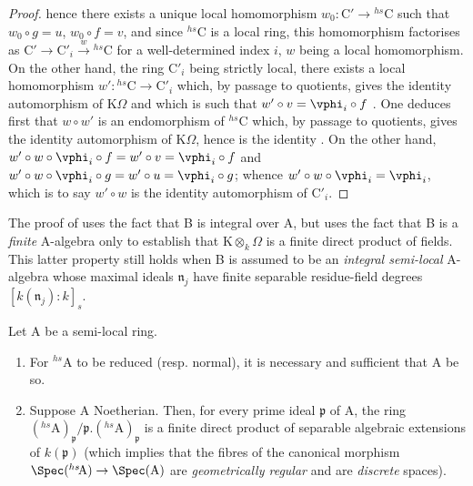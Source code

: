 \begin{proof}
hence there exists a unique local homomorphism $w_0:\mathrm{C}'\to{}^{hs}\!\mathrm{C}$ such that $w_0\circ g=u$, $w_0\circ f=v$, and since ${}^{hs}\!\mathrm{C}$ is a local ring, this homomorphism factorises as $\mathrm{C}'\to\mathrm{C}'_i\xrightarrow{w}{}^{hs}\!\mathrm{C}$ for a well-determined index $i$, $w$ being a local homomorphism.
On the other hand, the ring $\mathrm{C}'_i$ being strictly local, there exists a local homomorphism $w':{}^{hs}\!\mathrm{C}\to\mathrm{C}'_i$ which, by passage to quotients, gives the identity automorphism of $\mathrm{K}\Omega$ and which is such that $w'\circ v=\vphi_i\circ f$ .
One deduces first that $w\circ w'$ is an endomorphism of ${}^{hs}\!\mathrm{C}$ which, by passage to quotients, gives the identity automorphism of $\mathrm{K}\Omega$, hence
is the identity .
On the other hand, $w'\circ w\circ\vphi_i\circ f=w'\circ v=\vphi_i\circ f$ and $w'\circ w\circ\vphi_i\circ g=w'\circ u=\vphi_i\circ g$;
whence $w'\circ w\circ\vphi_i=\vphi_i$, which is to say $w'\circ w$ is the identity automorphism of $\mathrm{C}'_i$.
\end{proof}

\begin{remark}[18.8.11]
\label{IV.18.8.11}
The proof of  uses the fact that B is integral over A, but uses the fact that B is a \emph{finite} A-algebra only to establish that $\mathrm{K}\otimes_k\Omega$ is a finite direct product of fields.
This latter property still holds when B is assumed to be an \emph{integral semi-local} A-algebra whose maximal ideals $\mathfrak{n}_j$ have finite separable residue-field degrees $[k(\mathfrak{n}_j):k]_s$.
\end{remark}

\begin{proposition}[18.8.12]
\label{IV.18.8.12}
Let $\mathrm{A}$ be a semi-local ring.
\begin{enumerate}[label=\emph{\roman*)}]
  \item For ${}^{hs}\!\mathrm{A}$ to be reduced (resp. normal), it is necessary and sufficient that A be so.
  \item Suppose A Noetherian.
  Then, for every prime ideal $\mathfrak{p}$ of A, the ring $({}^{hs}\!\mathrm{A})_{\mathfrak{p}}/\mathfrak{p}.({}^{hs}\!\mathrm{A})_{\mathfrak{p}}$ is a finite direct product of separable algebraic extensions of $k(\mathfrak{p})$ (which implies that the fibres of the canonical morphism $\Spec({}^{hs}\!\mathrm{A})\to\Spec(\mathrm{A})$ are \emph{geometrically regular} and are \emph{discrete} spaces).
\end{enumerate}
\end{proposition}

